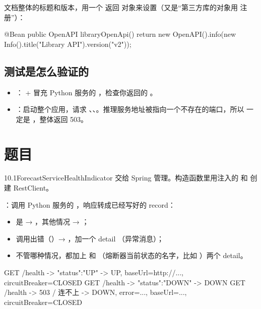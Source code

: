 文档整体的标题和版本，用一个  返回  对象来设置（又是“第三方库的对象用  注册”）：

\begin{java}
@Bean
public OpenAPI libraryOpenApi() {
    return new OpenAPI().info(new Info().title("Library API").version("v2"));
}
\end{java}

\subsection{测试是怎么验证的}

\begin{itemize}
  \item {}： +  冒充 Python 服务的 ，检查你返回的 。
  \item {}：启动整个应用，请求 、、。推理服务地址被指向一个不存在的端口，所以  一定是 ，整体返回 503。
\end{itemize}

\section{题目}

\begin{task}{10.1\quad ForecastServiceHealthIndicator}
交给 Spring 管理。构造函数里用注入的  和  创建 RestClient。

：调用 Python 服务的 ，响应转成已经写好的  record：
\begin{itemize}
  \item {} 是  → ，其他情况 → ；
  \item 调用出错（）→ ，加一个 detail （异常消息）；
  \item 不管哪种情况，都加上  和 （熔断器当前状态的名字，比如 ）两个 detail。
\end{itemize}

\begin{example}
\begin{plaincode}
GET /health -> {"status":"UP"}    ->  UP,   {baseUrl=http://..., circuitBreaker=CLOSED}
GET /health -> {"status":"DOWN"}  ->  DOWN
GET /health -> 503 / 连不上        ->  DOWN, {error=..., baseUrl=..., circuitBreaker=CLOSED}
\end{plaincode}
\end{example}
\end{task}

